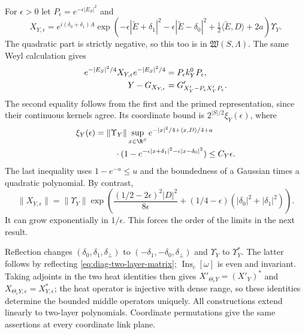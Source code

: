 For $\epsilon>0$ let $P_\epsilon=e^{-\epsilon|E_S|^2}$ and
\begin{equation}\label{eq:diag-two-layer-epsilon}
 X_{Y,\epsilon}=e^{i(\delta_0+\delta_1)A}
  \exp\left(-\epsilon|\widetilde E+\delta_1|^2
       -\epsilon|\widetilde E-\delta_0|^2
       +\tfrac12\langle\widetilde E,D\rangle+2a\right)\Upsilon_Y.
\end{equation}
The quadratic part is strictly negative, so this too is in
$\mathfrak W(S,\Lambda)$. The same Weyl calculation gives
\begin{align}\label{eq:diag-two-layer-approximation}
 e^{-|E_S|^2/4}X_{Y,\epsilon}e^{-|E_S|^2/4}
                      &=P_\epsilon k_Y^0P_\epsilon,\notag\\
 Y-G_{X_{Y,\epsilon}}&=
               G'_{X'_Y-P_\epsilon X'_YP_\epsilon}.
\end{align}
The second equality follows from the first and the primed
representation, since their continuous kernels agree. Its
coordinate bound is $2^{|S|/2}\xi_Y(\epsilon)$, where
\begin{equation}\label{eq:diag-two-layer-error}
 \begin{split}
 \xi_Y(\epsilon)={}&\|\Upsilon_Y\|
       \sup_{x\in\R^S}e^{-|x|^2/4+\langle x,D\rangle/4+a}\\
 &\quad\cdot(1-e^{-\epsilon|x+\delta_1|^2
                         -\epsilon|x-\delta_0|^2})
       \le C_Y\epsilon.
 \end{split}
\end{equation}
The last inequality uses $1-e^{-u}\le u$ and the boundedness
of a Gaussian times a quadratic polynomial. By contrast,
\begin{equation}\label{eq:diag-two-layer-operator-size}
 \|X_{Y,\epsilon}\|
 =\|\Upsilon_Y\|
   \exp\left(\frac{(1/2-2\epsilon)^2|D|^2}{8\epsilon}
                  +(1/4-\epsilon)(|\delta_0|^2+|\delta_1|^2)\right).
\end{equation}
It can grow exponentially in $1/\epsilon$. This forces the
order of the limits in the next result.

Reflection changes $(\delta_0,\delta_1,\delta_\perp)$ to
$(-\delta_1,-\delta_0,\delta_\perp)$ and
$\Upsilon_Y$ to $\Upsilon_Y^*$. The latter follows by reflecting
\eqref{eq:diag-two-layer-matrix}; $\operatorname{Ins}_c[\omega]$
is even and invariant. Taking adjoints in the two heat identities
then gives
$X'_{\Theta_cY}=(X'_Y)^*$ and
$X_{\Theta_cY,\epsilon}=X_{Y,\epsilon}^*$; the heat operator
is injective with dense range, so these identities determine
the bounded middle operators uniquely. All constructions extend
linearly to two-layer polynomials. Coordinate permutations
give the same assertions at every coordinate link plane.

